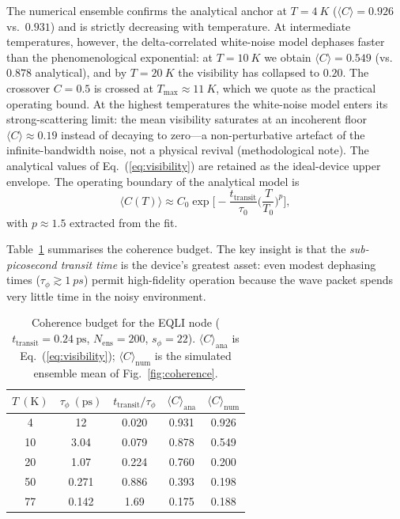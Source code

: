 \documentclass[11pt,a4paper]{article}
\newcommand{\expt}[1]{\langle#1\rangle}
\begin{document}
The numerical ensemble confirms the analytical anchor at $T=\SI{4}{K}$ 
($\expt{C}=0.926$ vs.\ $0.931$) and is strictly decreasing with temperature. 
At intermediate temperatures, however, the delta-correlated white-noise 
model dephases faster than the phenomenological exponential: at 
$T=\SI{10}{K}$ we obtain $\expt{C}=0.549$ (vs.\ $0.878$ analytical), and by 
$T=\SI{20}{K}$ the visibility has collapsed to $0.20$. The crossover 
$C=0.5$ is crossed at $T_{\max}\approx\SI{11}{K}$, which we quote as the 
practical operating bound. At the highest temperatures the white-noise model 
enters its strong-scattering limit: the mean visibility saturates at an 
incoherent floor $\expt{C}\approx0.19$ instead of decaying to zero---a 
non-perturbative artefact of the infinite-bandwidth noise, not a physical 
revival (methodological note). The analytical values of 
Eq.~(\ref{eq:visibility}) are retained as the ideal-device upper envelope. 
The operating boundary of the analytical model is
\begin{equation}
\expt{C(T)} \approx C_0\exp\!\Big[-\frac{t_{\text{transit}}}{\tau_0}
\Big(\frac{T}{T_0}\Big)^p\Big],
\label{eq:visibility}
\end{equation}
with $p\approx 1.5$ extracted from the fit.

Table~\ref{tab:coherence} summarises the coherence budget. The key insight is 
that the \emph{sub-picosecond transit time} is the device's greatest asset: 
even modest dephasing times ($\tau_\phi\gtrsim\SI{1}{ps}$) permit high-fidelity 
operation because the wave packet spends very little time in the noisy 
environment.

\begin{table}[h]
\centering
\caption{Coherence budget for the EQLI node ($t_{\mathrm{transit}} = 0.24~\mathrm{ps}$, 
$N_{\mathrm{ens}}=200$, $s_\phi=22$). $\langle C \rangle_{\mathrm{ana}}$ is 
Eq.~(\ref{eq:visibility}); $\langle C \rangle_{\mathrm{num}}$ is the simulated 
ensemble mean of Fig.~\ref{fig:coherence}.}
\label{tab:coherence}
\begin{tabular}{ccccc}
\hline
$T~(\mathrm{K})$ & $\tau_{\phi}~(\mathrm{ps})$ & $t_{\mathrm{transit}}/\tau_{\phi}$ & $\langle C \rangle_{\mathrm{ana}}$ & $\langle C \rangle_{\mathrm{num}}$ \\
\hline
4   & 12     & 0.020 & 0.931 & 0.926 \\
10  & 3.04   & 0.079 & 0.878 & 0.549 \\
20  & 1.07   & 0.224 & 0.760 & 0.200 \\
50  & 0.271  & 0.886 & 0.393 & 0.198 \\
77  & 0.142  & 1.69  & 0.175 & 0.188 \\
\hline
\end{tabular}
\end{table}
\end{document}
